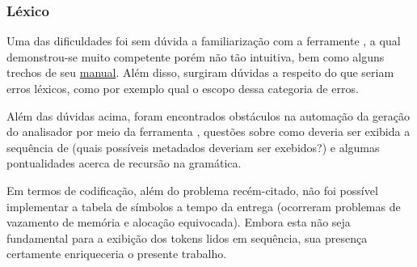 \documentclass[
	article,			%
	11pt,				%
	oneside,			%
	a4paper,			%
	english,			%
	brazil,				%
	sumario=tradicional
	]{abntex2}
\begin{document}
\subsubsection{Léxico}
Uma das dificuldades foi sem dúvida a familiarização com a ferramente , a qual demonstrou-se muito competente porém não tão intuitiva, bem como alguns trechos de seu \href{ftp://ftp.gnu.org/old-gnu/Manuals/flex-2.5.4/html_mono/flex.html}{manual}. Além disso, surgiram dúvidas a respeito do que seriam erros léxicos, como por exemplo qual o escopo dessa categoria de erros.

Além das dúvidas acima, foram encontrados obstáculos na automação da geração do analisador por meio da ferramenta , questões sobre como deveria ser exibida a sequência de  (quais possíveis metadados deveriam ser exebidos?) e algumas pontualidades acerca de recursão na gramática.

Em termos de codificação, além do problema recém-citado, não foi possível implementar a tabela de símbolos a tempo da entrega (ocorreram problemas de vazamento de memória e alocação equivocada). Embora esta não seja fundamental para a exibição dos tokens lidos em sequência, sua presença certamente enriqueceria o presente trabalho.
\end{document}
